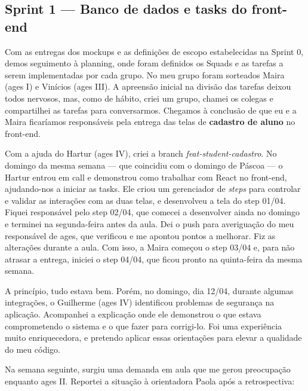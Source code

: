 \subsection{Sprint 1 --- Banco de dados e tasks do front-end}

Com as entregas dos mockups e as definições de escopo estabelecidas na Sprint 0,
demos seguimento à planning, onde foram definidos os Squads e as tarefas a serem
implementadas por cada grupo. No meu grupo foram sorteados Maira (\ac{ages} I) e
Vinícios (\ac{ages} III). A apreensão inicial na divisão das tarefas deixou todos nervosos,
mas, como de hábito, criei um grupo, chamei os colegas e compartilhei as tarefas para
conversarmos. Chegamos à conclusão de que eu e a Maira ficaríamos responsáveis pela
entrega das telas de \textbf{cadastro de aluno} no front-end.

Com a ajuda do Hartur (\ac{ages} IV), criei a branch \textit{feat-student-cadastro}. No
domingo da mesma semana --- que coincidiu com o domingo de Páscoa --- o Hartur
entrou em call e demonstrou como trabalhar com React no front-end, ajudando-nos a
iniciar as tasks. Ele criou um gerenciador de \textit{steps} para controlar e validar as
interações com as duas telas, e desenvolveu a tela do step 01/04. Fiquei responsável
pelo step 02/04, que comecei a desenvolver ainda no domingo e terminei na
segunda-feira antes da aula. Dei o push para averiguação do meu responsável de \ac{ages},
que verificou e me apontou pontos a melhorar. Fiz as alterações durante a aula. Com
isso, a Maira começou o step 03/04 e, para não atrasar a entrega, iniciei o step 04/04,
que ficou pronto na quinta-feira da mesma semana.

A princípio, tudo estava bem. Porém, no domingo, dia 12/04, durante algumas
integrações, o Guilherme (\ac{ages} IV) identificou problemas de segurança na aplicação.
Acompanhei a explicação onde ele demonstrou o que estava comprometendo o sistema
e o que fazer para corrigi-lo. Foi uma experiência muito enriquecedora, e pretendo
aplicar essas orientações para elevar a qualidade do meu código.

Na semana seguinte, surgiu uma demanda em aula que me gerou preocupação enquanto
\ac{ages} II. Reportei a situação à orientadora Paola após a retrospectiva:

